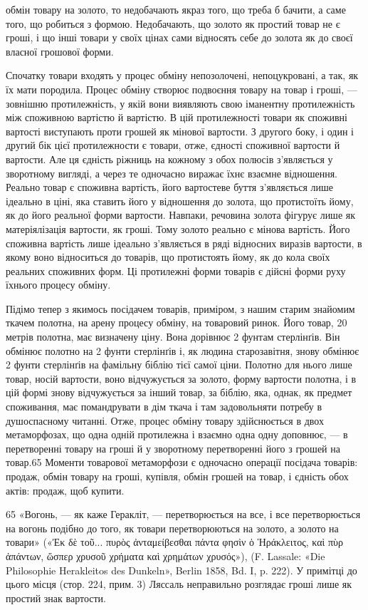 обмін товару на золото, то недобачають якраз того, що треба б
бачити, а саме того, що робиться з формою. Недобачають, що золото
як простий товар не є гроші, і що інші товари у своїх цінах
сами відносять себе до золота як до своєї власної грошової
форми.

Спочатку товари входять у процес обміну непозолочені, непоцукровані,
а так, як їх мати породила. Процес обміну створює
подвоєння товару на товар і гроші, — зовнішню протилежність,
у якій вони виявляють свою іманентну протилежність між споживною
вартістю й вартістю. В цій протилежності товари як
споживні вартості виступають проти грошей як мінової вартости.
З другого боку, і один і другий бік цієї протилежности
є товари, отже, єдності споживної вартости й вартости. Але ця
єдність ріжниць на кожному з обох полюсів з’являється у зворотному
вигляді, а через те одночасно виражає їхнє взаємне відношення.
Реально товар є споживна вартість, його вартостеве
буття з’являється лише ідеально в ціні, яка ставить його у відношення
до золота, що протистоїть йому, як до його реальної
форми вартости. Навпаки, речовина золота фігурує лише як матеріялізація
вартости, як гроші. Тому золото реально є мінова
вартість. Його споживна вартість лише ідеально з’являється в
ряді відносних виразів вартости, в якому воно відноситься до
товарів, що протистоять йому, як до кола своїх реальних споживних
форм. Ці протилежні форми товарів є дійсні форми руху
їхнього процесу обміну.

Підімо тепер з якимось посідачем товарів, приміром, з нашим
старим знайомим ткачем полотна, на арену процесу обміну, на
товаровий ринок. Його товар, 20 метрів полотна, має визначену
ціну. Вона дорівнює 2 фунтам стерлінґів. Він обмінює полотно
на 2 фунти стерлінґів і, як людина старозавітня, знову обмінює
2 фунти стерлінґів на фамільну біблію тієї самої ціни. Полотно
для нього лише товар, носій вартости, воно відчужується за
золото, форму вартости полотна, і в цій формі знову відчужується
за інший товар, за біблію, яка, однак, як предмет споживання,
має помандрувати в дім ткача і там задовольняти потребу
в душоспасному читанні. Отже, процес обміну товару здійснюється
в двох метаморфозах, що одна одній протилежна і взаємно
одна одну доповнює, — в перетворенні товару на гроші й у зворотному
перетворенні його з грошей на товар.65 Моменти товарової
метаморфози є одночасно операції посідача товарів: продаж,
обмін товару на гроші, купівля, обмін грошей на товар,
і єдність обох актів: продаж, щоб купити.

65 «Вогонь, — як каже Геракліт, — перетворюється на все, і все
перетворюється на вогонь подібно до того, як товари перетворюються на
золото, а золото на товари» («Ἐκ δὲ τοῦ... πυρὸς ἀνταμείβεσθαι πάντα φησὶν ὁ Ἡράκλειτος, καὶ πὺρ
ἁπάντων, ὥσπερ χρυσοῦ χρήματα καὶ χρημάτων χρυσός»), (F. Lassale:
«Die Philosophie Herakleitos des Dunkeln», Berlin 1858, Bd. I, p. 222).
У примітці до цього місця (стор. 224, прим. 3) Ляссаль неправильно розглядає
гроші лише як простий знак вартости.
